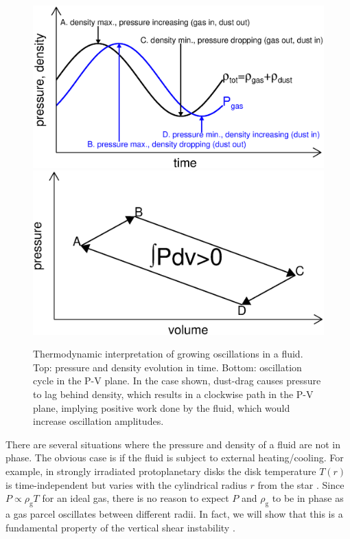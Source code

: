 \documentclass[iop, numberedappendix]{emulateapj}
\newcommand{\rhog}{\rho_\mathrm{g}}
\begin{document}
\begin{figure}
  \includegraphics[width=\linewidth]{figures/drag}\\
\includegraphics[width=\linewidth]{figures/pdv}
  \caption{Thermodynamic interpretation of growing oscillations in a
    fluid. Top: pressure and density evolution in time. 
    Bottom: oscillation cycle in the P-V plane. In the case shown, 
    dust-drag causes 
    pressure to lag behind density, which results in a clockwise path in
    the P-V plane, implying positive work done by the fluid, which 
     would increase oscillation amplitudes.  
    \label{pdv_cartoon}
  }
\end{figure}

There are several situations where the pressure and density of a fluid
are not in phase. The obvious case is if the fluid is subject to
external heating/cooling. For example, in strongly irradiated
protoplanetary disks the
disk temperature  $T(r)$ is time-independent but varies with the cylindrical radius
$r$ from the star \citep{chiang97}. Since $P\propto \rhog T$ for an
ideal gas, %
there is no reason to expect $P$ and $\rhog$ to 
be in phase as a gas parcel oscillates between different radii. In
fact, we will show that this is a fundamental property of the vertical
shear instability \citep{lin15}.   
\end{document}
